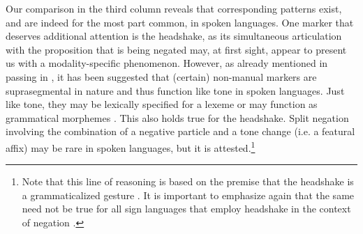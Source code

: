 \documentclass[output=paper,colorlinks,citecolor=brown]{langscibook}
\begin{document}
Our comparison in the third column reveals that corresponding patterns exist, and are indeed for the most part common, in spoken languages. One marker that deserves additional attention is the headshake, as its simultaneous articulation with the proposition that is being negated may, at first sight, appear to present us with a modality-specific phenomenon. However, as already mentioned in passing in , it has been suggested that (certain) non-manual markers are suprasegmental in nature and thus function like tone in spoken languages. Just like tone, they may be lexically specified for a lexeme or may function as grammatical morphemes \citep{Yip2002}. This also holds true for the headshake. Split negation involving the combination of a negative particle and a tone change (i.e. a featural affix) may be rare in spoken languages, but it is attested.\footnote{Note that this line of reasoning is based on the premise that the headshake is a grammaticalized gesture \citep[see][]{Pfau2015}. It is important to emphasize again that the same need not be true for all sign languages that employ headshake in the context of negation \citep[see e.g.][for Australian Sign Language]{Johnston2018}.}\clearpage
\end{document}
